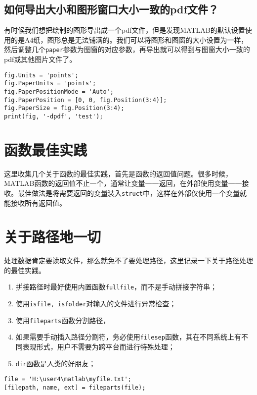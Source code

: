 \subsection{如何导出大小和图形窗口大小一致的pdf文件？}

有时候我们想把绘制的图形导出成一个pdf文件，但是发现MATLAB的默认设置使用的是A4纸，图形总是无法铺满的。我们可以将图形和图窗的大小设置为一样，然后调整几个\texttt{paper}参数为图窗的对应参数，再导出就可以得到与图窗大小一致的pdf或其他图片文件了。

\begin{verbatim}
fig.Units = 'points';
fig.PaperUnits = 'points';
fig.PaperPositionMode = 'Auto';
fig.PaperPosition = [0, 0, fig.Position(3:4)];
fig.PaperSize = fig.Position(3:4);
print(fig, '-dpdf', 'test');
\end{verbatim}

\section{函数最佳实践}

这里收集几个关于函数的最佳实践，首先是函数的返回值问题。很多时候，MATLAB函数的返回值不止一个，通常让变量一一返回，在外部使用变量一一接收。最佳做法是将需要返回的变量装入\texttt{struct}中，这样在外部仅使用一个变量就能接收所有返回值。

\section{关于路径地一切}

处理数据肯定要读取文件，那么就免不了要处理路径，这里记录一下关于路径处理的最佳实践。

\begin{enumerate}
    \item 拼接路径时最好使用内置函数\texttt{fullfile}，而不是手动拼接字符串；
    \item 使用\texttt{isfile, isfolder}对输入的文件进行异常检查；
    \item 使用\texttt{fileparts}函数分割路径，
    \item 如果需要手动插入路径分割符，务必使用\texttt{filesep}函数，其在不同系统上有不同表现形式，用户不需要为跨平台而进行特殊处理；
    \item \texttt{dir}函数是人类的好朋友；
\end{enumerate}

\begin{verbatim}
file = 'H:\user4\matlab\myfile.txt';
[filepath, name, ext] = fileparts(file);
\end{verbatim}

